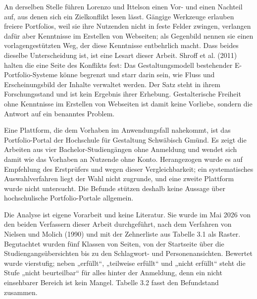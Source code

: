 An derselben Stelle führen Lorenzo und Ittelson einen Vor- und einen Nachteil auf, aus denen sich ein Zielkonflikt lesen lässt. Gängige Werkzeuge erlauben freiere Portfolios, weil sie ihre Nutzenden nicht in feste Felder zwingen, verlangen dafür aber Kenntnisse im Erstellen von Webseiten; als Gegenbild nennen sie einen vorlagengestützten Weg, der diese Kenntnisse entbehrlich macht. Dass beides dieselbe Unterscheidung ist, ist eine Lesart dieser Arbeit. Shroff et al. (2011) halten die eine Seite des Konflikts fest: Das Gestaltungsmodell bestehender E-Portfolio-Systeme könne begrenzt und starr darin sein, wie Fluss und Erscheinungsbild der Inhalte verwaltet werden. Der Satz steht in ihrem Forschungsstand und ist kein Ergebnis ihrer Erhebung. Gestalterische Freiheit ohne Kenntnisse im Erstellen von Webseiten ist damit keine Vorliebe, sondern die Antwort auf ein benanntes Problem.

Eine Plattform, die dem Vorhaben im Anwendungsfall nahekommt, ist das Portfolio-Portal der Hochschule für Gestaltung Schwäbisch Gmünd. Es zeigt die Arbeiten aus vier Bachelor-Studiengängen ohne Anmeldung und wendet sich damit wie das Vorhaben an Nutzende ohne Konto. Herangezogen wurde es auf Empfehlung des Erstprüfers und wegen dieser Vergleichbarkeit; ein systematisches Auswahlverfahren liegt der Wahl nicht zugrunde, und eine zweite Plattform wurde nicht untersucht. Die Befunde stützen deshalb keine Aussage über hochschulische Portfolio-Portale allgemein.

Die Analyse ist eigene Vorarbeit und keine Literatur. Sie wurde im Mai 2026 von den beiden Verfassern dieser Arbeit durchgeführt, nach dem Verfahren von Nielsen und Molich (1990) und mit der Zehnerliste aus Tabelle 3.1 als Raster. Begutachtet wurden fünf Klassen von Seiten, von der Startseite über die Studiengangsübersichten bis zu den Schlagwort- und Personenansichten. Bewertet wurde vierstufig; neben „erfüllt“, „teilweise erfüllt“ und „nicht erfüllt“ steht die Stufe „nicht beurteilbar“ für alles hinter der Anmeldung, denn ein nicht einsehbarer Bereich ist kein Mangel. Tabelle 3.2 fasst den Befundstand zusammen.


